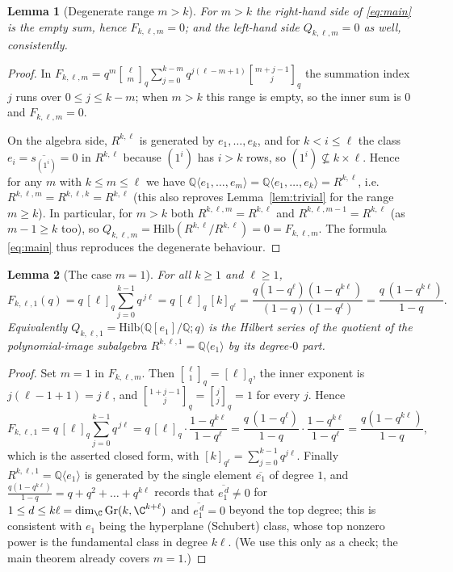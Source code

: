 \documentclass{amsart}
\newtheorem{lemma}{Lemma}
\theoremstyle{definition}
\newcommand{\Gr}{\mathrm{Gr}}
\newcommand{\Hilb}{\mathrm{Hilb}}
\newcommand{\qbin}[2]{\genfrac{[}{]}{0pt}{}{#1}{#2}_q}
\newcommand{\Q}{\mathbb{Q}}
\newcommand{\rkl}{R^{k,\ell}}
\newcommand{\Rklm}{R^{k,\ell,m}}
\begin{document}
\begin{lemma}[Degenerate range $m>k$]\label{lem:mbigk}
For $m>k$ the right-hand side of \eqref{eq:main} is the empty sum, hence
$F_{k,\ell,m}=0$; and the left-hand side $Q_{k,\ell,m}=0$ as well, consistently.
\end{lemma}

\begin{proof}
In $F_{k,\ell,m}=q^{m}\qbin{\ell}{m}\sum_{j=0}^{k-m}q^{j(\ell-m+1)}\qbin{m+j-1}{j}$
the summation index $j$ runs over $0\le j\le k-m$; when $m>k$ this range is empty,
so the inner sum is $0$ and $F_{k,\ell,m}=0$.

On the algebra side, $\rkl$ is generated by $e_1,\dots,e_k$, and for $k<i\le\ell$
the class $e_i=\overline{s_{(1^i)}}=0$ in $\rkl$ because $(1^i)$ has $i>k$ rows, so
$(1^i)\not\subseteq k\times\ell$. Hence for any $m$ with $k\le m\le\ell$ we have
$\Q\langle e_1,\dots,e_m\rangle=\Q\langle e_1,\dots,e_k\rangle=\rkl$, i.e.\
$\Rklm=R^{k,\ell,k}=\rkl$ (this also reproves Lemma~\ref{lem:trivial} for the
range $m\ge k$). In particular, for $m>k$ both $\Rklm=\rkl$ and
$R^{k,\ell,m-1}=\rkl$ (as $m-1\ge k$ too), so
$Q_{k,\ell,m}=\Hilb(\rkl/\rkl)=0=F_{k,\ell,m}$. The formula \eqref{eq:main} thus
reproduces the degenerate behaviour.
\end{proof}

\begin{lemma}[The case $m=1$]\label{lem:m1}
For all $k\ge1$ and $\ell\ge1$,
\[
F_{k,\ell,1}(q)=q\,[\ell]_q\sum_{j=0}^{k-1}q^{\,j\ell}
=q\,[\ell]_q\,[k]_{q^{\ell}}
=\frac{q(1-q^{\ell})(1-q^{k\ell})}{(1-q)(1-q^{\ell})}
=\frac{q\,(1-q^{k\ell})}{1-q}.
\]
Equivalently $Q_{k,\ell,1}=\Hilb\big(\Q[e_1]/\Q;q\big)$ is the Hilbert series of the
quotient of the polynomial-image subalgebra $R^{k,\ell,1}=\Q\langle e_1\rangle$ by
its degree-$0$ part.
\end{lemma}

\begin{proof}
Set $m=1$ in $F_{k,\ell,m}$. Then $\qbin{\ell}{1}=[\ell]_q$, the inner exponent is
$j(\ell-1+1)=j\ell$, and $\qbin{1+j-1}{j}=\qbin{j}{j}=1$ for every $j$. Hence
\[
F_{k,\ell,1}=q\,[\ell]_q\sum_{j=0}^{k-1}q^{\,j\ell}
=q\,[\ell]_q\cdot\frac{1-q^{k\ell}}{1-q^{\ell}}
=\frac{q\,(1-q^{\ell})}{1-q}\cdot\frac{1-q^{k\ell}}{1-q^{\ell}}
=\frac{q(1-q^{k\ell})}{1-q},
\]
which is the asserted closed form, with $[k]_{q^{\ell}}=\sum_{j=0}^{k-1}q^{j\ell}$.
Finally $R^{k,\ell,1}=\Q\langle e_1\rangle$ is generated by the single element
$\overline{e_1}$ of degree $1$, and $\frac{q(1-q^{k\ell})}{1-q}=q+q^2+\dots+q^{k\ell}$
records that $\overline{e_1^{\,d}}\ne0$ for $1\le d\le k\ell=\dim_{\C}\Gr(k,\C^{k+\ell})$
and $\overline{e_1^{\,d}}=0$ beyond the top degree; this is consistent with $e_1$
being the hyperplane (Schubert) class, whose top nonzero power is the fundamental
class in degree $k\ell$. (We use this only as a check; the main theorem already
covers $m=1$.)
\end{proof}
\end{document}
